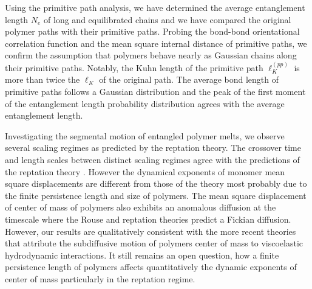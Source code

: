 \documentclass[pre,showpacs,notitlepage,twocolumn]{revtex4-1}
\begin{document}
 
 Using the primitive path analysis, we have  determined the average entanglement length $N_e$ of long and equilibrated chains  and we have compared  the original polymer paths with their primitive paths.
 Probing the bond-bond orientational correlation function and the mean square internal distance of primitive paths, we confirm the assumption that polymers behave nearly as Gaussian chains along their primitive paths.
 Notably, the Kuhn length  of the primitive path $\ell_K^{(pp)}$ is more than twice the $\ell_K$ of the original path.
 The average bond length of primitive paths follows a Gaussian distribution and the peak of the first moment of the entanglement length probability distribution  
 agrees with the  average entanglement length. 
 
 
 Investigating the segmental motion of entangled  polymer melts, we  observe several scaling regimes as predicted by the reptation theory. The crossover time and length scales between distinct scaling regimes agree with the predictions of the reptation theory  \cite{polymerDoi,KGmodel}. However the dynamical exponents of monomer mean square displacements are different from
 those of the theory most probably due to the finite persistence length and size of polymers.  The mean square displacement of center of mass of polymers
 also exhibits an anomalous diffusion at the timescale where the Rouse and reptation  theories predict a Fickian diffusion.  However, our results are qualitatively consistent
 with the more recent theories \cite{Farago1,Farago2} that  attribute the subdiffusive motion of polymers center of mass to viscoelastic hydrodynamic interactions. It still remains an open question, how a finite persistence length of polymers  affects quantitatively the dynamic exponents of center of mass particularly in the reptation regime.
   
 
 
\end{document}
